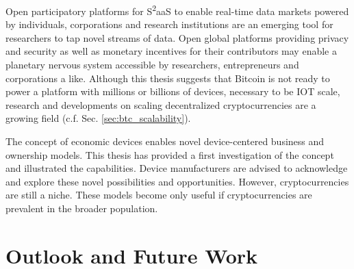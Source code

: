Open participatory platforms for S\textsuperscript{2}aaS to enable real-time data markets \parencite{worner2016design} powered by individuals, corporations and research institutions are an emerging tool for researchers to tap novel streams of data. Open global platforms providing privacy and security as well as monetary incentives for their contributors may enable a planetary nervous system \parencite{Giannotti2012}accessible by researchers, entrepreneurs and corporations a like. Although this thesis suggests that Bitcoin is not ready to power a platform with millions or billions of devices, necessary to be \ac{IOT} scale, research and developments on scaling decentralized cryptocurrencies are a growing field (c.f. Sec. \ref{sec:btc_scalability}).

The concept of economic devices enables novel device-centered business and ownership models. This thesis has provided a first investigation of the concept and illustrated the capabilities. Device manufacturers are advised to acknowledge and explore these novel possibilities and opportunities. However, cryptocurrencies are still a niche. These models become only useful if cryptocurrencies are prevalent in the broader population.


\section{Outlook and Future Work}

